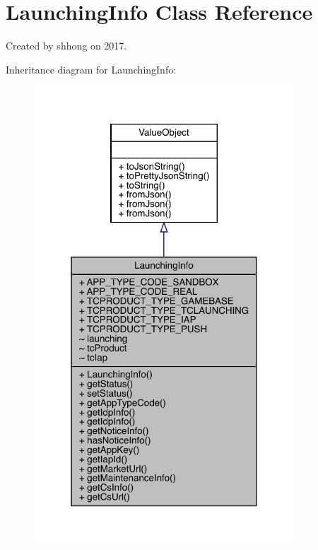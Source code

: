 \hypertarget{classcom_1_1toast_1_1android_1_1gamebase_1_1launching_1_1data_1_1_launching_info}{}\section{Launching\+Info Class Reference}
\label{classcom_1_1toast_1_1android_1_1gamebase_1_1launching_1_1data_1_1_launching_info}


Created by shhong on 2017.  




Inheritance diagram for Launching\+Info\+:\nopagebreak
\begin{figure}[H]
\begin{center}
\leavevmode
\includegraphics[width=277pt]{classcom_1_1toast_1_1android_1_1gamebase_1_1launching_1_1data_1_1_launching_info__inherit__graph}
\end{center}
\end{figure}


